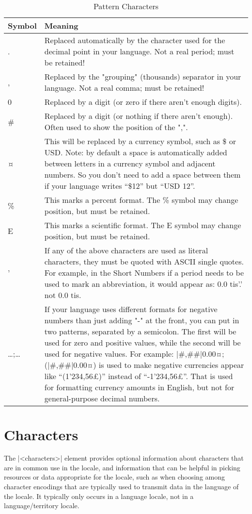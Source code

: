 \begin{longtable}{lp{11cm}}
\caption{Pattern Characters}\\
\toprule
Symbol & Meaning\\
\midrule
.	&Replaced automatically by the character used for the decimal point in your language. Not a real period; must be retained!\\
,	&Replaced by the "grouping" (thousands) separator in your language. Not a real comma; must be retained!\\
0	&Replaced by a digit (or zero if there aren't enough digits).\\
\#	&Replaced by a digit (or nothing if there aren't enough). Often used to show the position of the ",".\\
¤	&This will be replaced by a currency symbol, such as \$ or USD. Note: by default a space is automatically added between letters in a currency symbol and adjacent numbers. So you don't need to add a space between them if your language writes \enquote{\$12} but \enquote{USD 12}.\\
\%	&This marks a percent format. The \% symbol may change position, but must be retained.\\
E	&This marks a scientific format. The E symbol may change position, but must be retained.\\
'	&If any of the above characters are used as literal characters, they must be quoted with ASCII single quotes. For example, in the Short Numbers if a period needs to be used to mark an abbreviation, it would appear as:
0.0 tis'.'
not
0.0 tis.\\
\ldots;\ldots	&If your language uses different formats for negative numbers than just adding "-" at the front, you can put in two patterns, separated by a semicolon. The first will be used for zero and positive values, while the second will be used for negative values.
For example: |#,##|0.00¤;(|#,##|0.00¤) is used to make negative currencies appear like \enquote{(1'234,56£)} instead of \enquote{-1'234,56£}. That is used for formatting currency amounts in English, but not for general-purpose decimal numbers.\\
\bottomrule
\end{longtable}

\section{Characters}
The |<characters>| element provides optional information about characters that are in common use in the locale, and information that can be helpful in picking resources or data appropriate for the locale, such as when choosing among character encodings that are typically used to transmit data in the language of the locale. It typically only occurs in a language locale, not in a language/territory locale.

